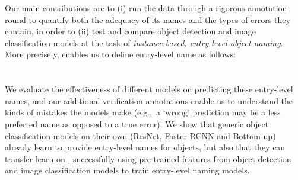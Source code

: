 Our main contributions are to (i) run the \mn data through a rigorous annotation round to quantify both the adequacy of its names and the types of errors they contain, in order to (ii) test and compare object detection and image classification models at the task of \emph{instance-based, entry-level object naming}. 
More precisely, \mn enables us to define entry-level name as follows:\\
\\\\
We evaluate the effectiveness of different models on predicting these entry-level names, and our additional verification annotations enable us to understand the kinds of mistakes the models make (e.g.,~a `wrong' prediction may be a less preferred name as opposed to a true error).
We show that generic object classification models on their own (ResNet, Faster-RCNN and Bottom-up) already learn to provide entry-level names for objects, but also that they can transfer-learn on \mn, successfully using pre-trained features from object detection and image classification models to train entry-level naming models. 


%


\iffalse



